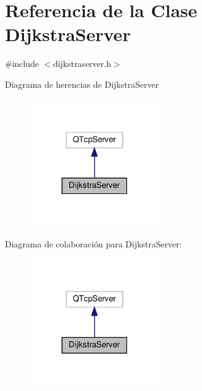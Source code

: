 \hypertarget{class_dijkstra_server}{}\section{Referencia de la Clase Dijkstra\+Server}
\label{class_dijkstra_server}


{\ttfamily \#include $<$dijkstraserver.\+h$>$}



Diagrama de herencias de Dijkstra\+Server
\nopagebreak
\begin{figure}[H]
\begin{center}
\leavevmode
\includegraphics[width=159pt]{class_dijkstra_server__inherit__graph}
\end{center}
\end{figure}


Diagrama de colaboración para Dijkstra\+Server\+:
\nopagebreak
\begin{figure}[H]
\begin{center}
\leavevmode
\includegraphics[width=159pt]{class_dijkstra_server__coll__graph}
\end{center}
\end{figure}
